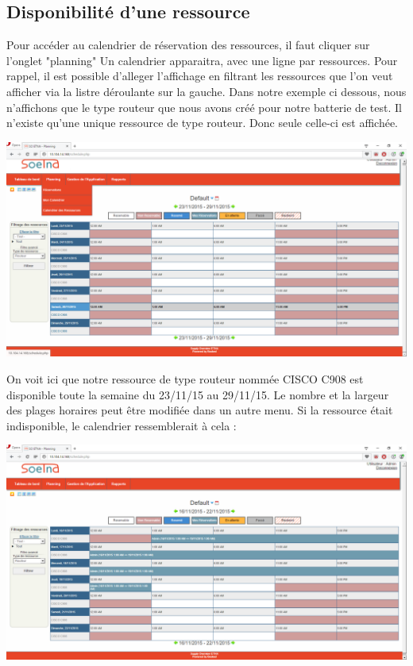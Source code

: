 \documentclass[a4paper,11pt]{article}
\begin{document}
\subsection{Disponibilité d'une ressource}

Pour accéder au calendrier de réservation des ressources, il faut cliquer sur l'onglet "planning"
Un calendrier apparaitra, avec une ligne par ressources. Pour rappel, il est possible d'alleger l'affichage
en filtrant les ressources que l'on veut afficher via la listre déroulante sur la gauche. Dans notre exemple ci dessous, nous n'affichons que
le type routeur que nous avons créé pour notre batterie de test. Il n'existe qu'une unique ressource de type routeur.
Donc seule celle-ci est affichée.

\includegraphics[width=15cm]{./resa1.PNG}

On voit ici que notre ressource de type routeur nommée CISCO C908 est disponible toute la semaine du 23/11/15 au 29/11/15.
Le nombre et la largeur des plages horaires peut être modifiée dans un autre menu. Si la ressource était indisponible,
le calendrier ressemblerait à cela :

\includegraphics[width=15cm]{./resa3.PNG}
\end{document}

